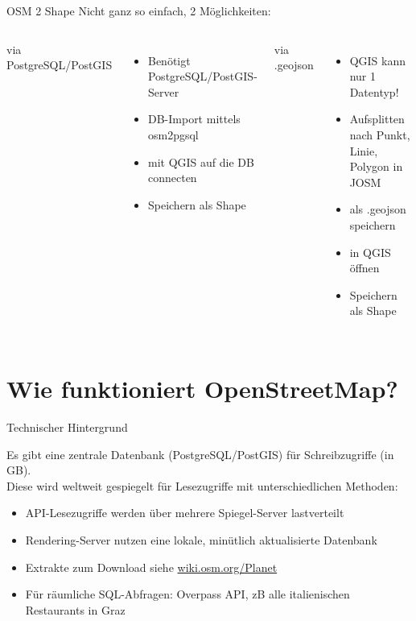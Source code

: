 \documentclass{beamer}
\begin{document}
\begin{frame}{OSM 2 Shape}
	Nicht ganz so einfach, 2 Möglichkeiten:
\vspace{3mm}

 \begin{columns}[c]
	via PostgreSQL/PostGIS
		\begin{itemize}
			\item Benötigt PostgreSQL/PostGIS-Server
			\item DB-Import mittels osm2pgsql
			\item mit QGIS auf die DB connecten
			\item Speichern als Shape
		\end{itemize}
	via .geojson
		\begin{itemize}
			\item QGIS kann nur 1 Datentyp!
			\item Aufsplitten nach Punkt, Linie, Polygon in JOSM
			\item als .geojson speichern
			\item in QGIS öffnen
			\item Speichern als Shape
		\end{itemize}
\end{columns}

\end{frame}

\section{Wie funktioniert OpenStreetMap?}

\begin{frame}{Technischer Hintergrund}

Es gibt eine zentrale Datenbank (PostgreSQL/PostGIS) für Schreibzugriffe (in GB).\\
\pause
Diese wird weltweit gespiegelt für Lesezugriffe mit unterschiedlichen Methoden:

\begin{itemize}
  \item API-Lesezugriffe werden über mehrere Spiegel-Server lastverteilt
  \item Rendering-Server nutzen eine lokale, minütlich aktualisierte Datenbank
  \item Extrakte zum Download siehe \href{http://wiki.osm.org/Planet}{wiki.osm.org/Planet}
  \item Für räumliche SQL-Abfragen: Overpass API, zB alle italienischen Restaurants in Graz
\end{itemize}

\end{frame}
\end{document}
